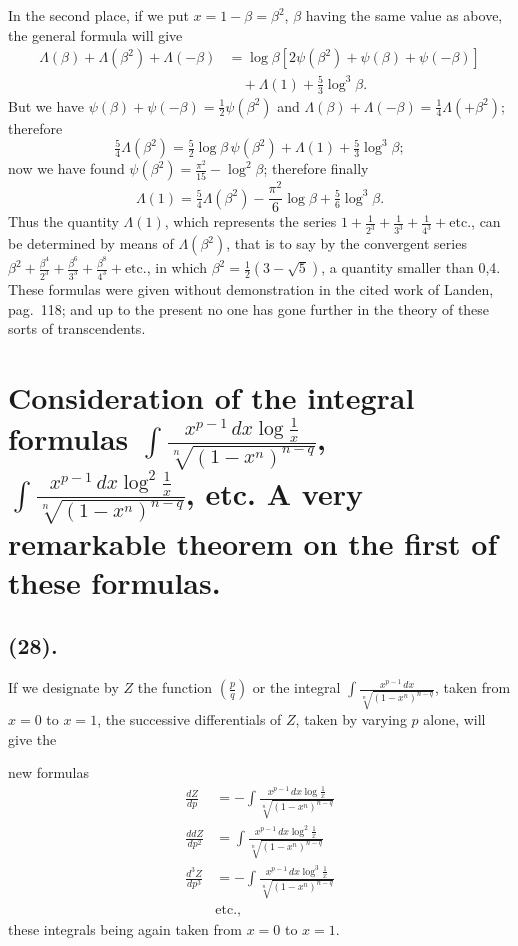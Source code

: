 \documentclass{article}
\begin{document}
In the second place, if we put $x=1-\beta=\beta^{2}$, $\beta$ having the same value as above, the general formula will give
\[ \begin{aligned} \Lambda(\beta)+\Lambda(\beta^{2})+\Lambda(-\beta)&=\log\beta\left[2\psi(\beta^{2})+\psi(\beta)+\psi(-\beta)\right]\\ &\quad+\Lambda(1)+\tfrac{5}{3}\log^{3}\beta. \end{aligned} \]
But we have $\psi(\beta)+\psi(-\beta)=\frac{1}{2}\psi(\beta^{2})$ and $\Lambda(\beta)+\Lambda(-\beta)=\frac{1}{4}\Lambda(+\beta^{2})$; therefore
\[ \tfrac{5}{4}\Lambda(\beta^{2})=\tfrac{5}{2}\log\beta\,\psi(\beta^{2})+\Lambda(1)+\tfrac{5}{3}\log^{3}\beta; \]
now we have found $\psi(\beta^{2})=\frac{\pi^{2}}{15}-\log^{2}\beta$; therefore finally
\[ \Lambda(1)=\tfrac{5}{4}\Lambda(\beta^{2})-\frac{\pi^{2}}{6}\log\beta+\tfrac{5}{6}\log^{3}\beta. \]
Thus the quantity $\Lambda(1)$, which represents the series $1+\frac{1}{2^{3}}+\frac{1}{3^{3}}+\frac{1}{4^{3}}+\text{etc.}$, can be determined by means of $\Lambda(\beta^{2})$, that is to say by the convergent series $\beta^{2}+\frac{\beta^{4}}{2^{3}}+\frac{\beta^{6}}{3^{3}}+\frac{\beta^{8}}{4^{3}}+\text{etc.}$, in which $\beta^{2}=\frac{1}{2}(3-\sqrt{5})$, a quantity smaller than 0,4. These formulas were given without demonstration in the cited work of Landen, pag.~118; and up to the present no one has gone further in the theory of these sorts of transcendents.

\section*{Consideration of the integral formulas $\displaystyle\int\frac{x^{p-1}\,dx\log\frac{1}{x}}{\sqrt[n]{(1-x^{n})^{n-q}}}$, $\displaystyle\int\frac{x^{p-1}\,dx\log^{2}\frac{1}{x}}{\sqrt[n]{(1-x^{n})^{n-q}}}$, etc. A very remarkable theorem on the first of these formulas.}

\subsection*{(28).}

If we designate by $Z$ the function $\left(\frac{p}{q}\right)$ or the integral $\displaystyle\int\frac{x^{p-1}\,dx}{\sqrt[n]{(1-x^{n})^{n-q}}}$, taken from $x=0$ to $x=1$, the successive differentials of $Z$, taken by varying $p$ alone, will give the

new formulas
\[ \begin{aligned} \frac{dZ}{dp}&=-\int\frac{x^{p-1}\,dx\log\frac{1}{x}}{\sqrt[n]{(1-x^{n})^{n-q}}}\\ \frac{ddZ}{dp^{2}}&=\int\frac{x^{p-1}\,dx\log^{2}\frac{1}{x}}{\sqrt[n]{(1-x^{n})^{n-q}}}\\ \frac{d^{3}Z}{dp^{3}}&=-\int\frac{x^{p-1}\,dx\log^{3}\frac{1}{x}}{\sqrt[n]{(1-x^{n})^{n-q}}}\\ &\text{etc.}, \end{aligned} \]
these integrals being again taken from $x=0$ to $x=1$.
\end{document}
